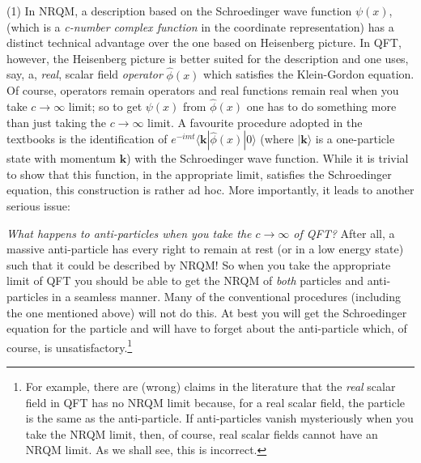 \documentclass{article}
\def\ket#1{|#1\rangle}                    %
\def\bk#1#2#3{{\langle #1|#2|#3\rangle}}  %
\begin{document}
 (1) In NRQM, a description based on  the  Schroedinger wave function $\psi(x)$, (which is a \textit{c-number complex function }  in the coordinate representation) has a distinct technical advantage over the one based on Heisenberg picture. In QFT, however, the Heisenberg picture is better suited for the description and one  uses, say,  a, \textit{real}, scalar field \textit{operator} $\hat \phi(x)$ which satisfies the Klein-Gordon equation. Of course, operators remain operators and real functions remain real when you take $c\to\infty$ limit; so to get $\psi(x)$ from $\hat \phi(x)$ one has to do something more than just taking the $c\to\infty$ limit. A favourite procedure adopted in the textbooks
  is the identification of $e^{-i mt}\bk{{\bm k}}{\hat \phi(x)}{0}$ (where $\ket{{\bm{k}}}$ is a one-particle state with momentum $\bm{k}$) with the Schroedinger wave function. While it is trivial to show that this function, in the appropriate limit, satisfies the Schroedinger equation, this construction is rather ad hoc. More importantly, it leads to another serious issue: 
 
 \textit{What happens to anti-particles when you take the $c\to \infty$ of QFT?} After all, a massive anti-particle has every right to remain at rest (or  in a low energy state) such that it could be described by NRQM! So when you take the appropriate limit of QFT you should be able to get the NRQM of \textit{both} particles and anti-particles in a seamless manner. Many of the conventional procedures (including the one mentioned above) will not do this.
 At best you will get the Schroedinger equation for the particle and will have to forget about the anti-particle which, of course, is unsatisfactory.\footnote{For example, there are (wrong) claims in the literature that the \textit{real} scalar field in QFT has no NRQM limit because, for a real scalar field, the particle is the same as the anti-particle. If anti-particles vanish mysteriously when you take the NRQM limit, then, of course, real scalar fields cannot have an NRQM limit. As we shall see, this is  incorrect.} 
 
\end{document}
